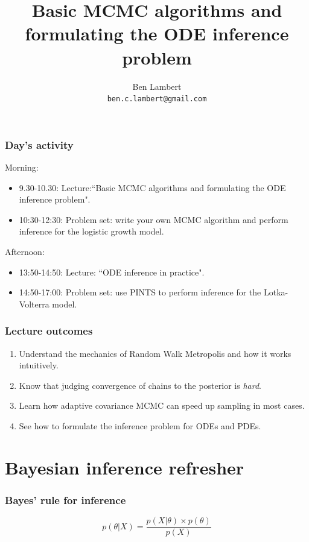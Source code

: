 \documentclass[handout]{beamer}
\title{Basic MCMC algorithms and formulating the ODE inference problem}
\author[Ben Lambert]{Ben Lambert\inst{1}\\ \texttt{ben.c.lambert@gmail.com}}
\date{\displaydate{date}}
\institute[University of Oxford]{
	\inst{1}University of Oxford}
\begin{document}
\begin{frame}
\titlepage
\end{frame}


\begin{frame}
	\frametitle{Day's activity}
	
	Morning:
	
	\begin{itemize}
		\item 9.30-10.30: Lecture:``Basic MCMC algorithms and formulating the ODE inference problem".
		\item 10:30-12:30: Problem set: write your own MCMC algorithm and perform inference for the logistic growth model.
	\end{itemize}
	
	Afternoon:
	
	\begin{itemize}
		\item 13:50-14:50: Lecture: ``ODE inference in practice".
		\item 14:50-17:00: Problem set: use PINTS to perform inference for the Lotka-Volterra model.
	\end{itemize}
	
\end{frame}


\begin{frame}
\frametitle{Lecture outcomes}

\begin{enumerate}
\item Understand the mechanics of Random Walk Metropolis and how it works intuitively.
\item Know that judging convergence of chains to the posterior is \textit{hard}.
\item Learn how adaptive covariance MCMC can speed up sampling in most cases.
\item See how to formulate the inference problem for ODEs and PDEs.
\end{enumerate}

\end{frame}

\section{Bayesian inference refresher}
\frame{\tableofcontents[currentsection]}

\begin{frame}
	\frametitle{Bayes' rule for inference}
	
	
	\Large
	\begin{equation}
	p(\theta|X) = \frac{p(X|\theta)\times p(\theta)}{p(X)}
	\end{equation}
	
\end{frame}
\end{document}
